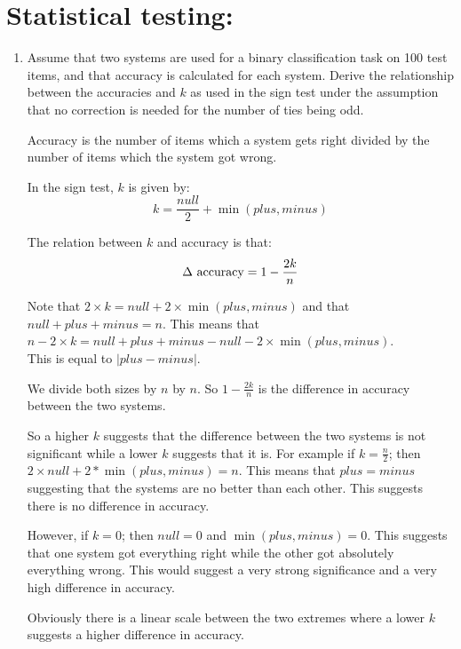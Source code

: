 \documentclass[10pt,\jkfside,a4paper]{article}
\begin{document}
\section*{Statistical testing:}

\begin{enumerate}

\item  Assume that two systems are used for a binary classification task on 100
test items, and that accuracy is calculated for each system. Derive the
relationship between the accuracies and $k$ as used in the sign test under
the assumption that no correction is needed for the number of ties being
odd.

Accuracy is the number of items which a system gets right divided by the 
number of items which the system got wrong.

In the sign test, $k$ is given by:
\begin{equation}
k = \frac{null}{2} + \min(plus, minus)
\end{equation}

The relation between $k$ and accuracy is that:
\begin{equation}
\Delta\text{ accuracy} = 1 - \frac{2k}{n}\\
\end{equation}

Note that $2 \times k = null + 2 \times \min(plus, minus)$ and that $null + plus + minus = n$.
This means that $n - 2 \times k = null + plus + minus - null - 2 \times \min(plus, minus)$. \\
This is equal to $|plus - minus|$. 

We divide both sizes by $n$ by $n$. So $1 - \frac{2k}{n}$ is the difference in accuracy 
between the two systems.

So a higher $k$ suggests that the difference between the two systems is not significant while a 
lower $k$ suggests that it is. For example if $k = \frac{n}{2}$; then $2 \times null + 2 * \min(plus, minus) = n$. 
This means that $plus = minus$ suggesting that the systems are no better than each other. 
This suggests there is no difference in accuracy.

However, if $k = 0$; then $null = 0$ and $\min(plus, minus) = 0$. This suggests that one system got everything 
right while the other got absolutely everything wrong. This would suggest a very strong significance and a very high 
difference in accuracy.

Obviously there is a linear scale between the two extremes where a lower $k$ suggests a higher difference in accuracy.


\end{enumerate}
\end{document}
